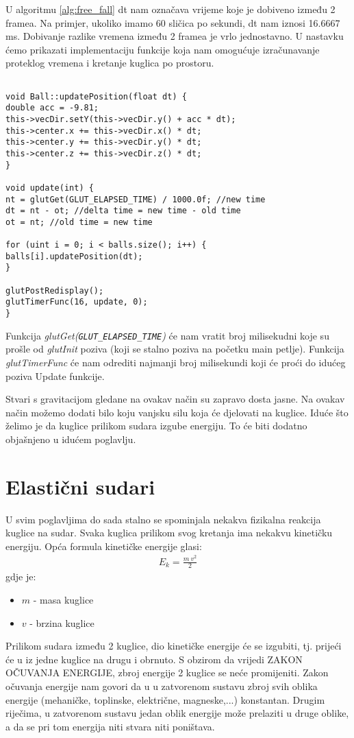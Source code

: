 U algoritmu \ref{alg:free_fall} dt nam označava vrijeme koje je dobiveno između 2 framea. Na primjer, ukoliko imamo 60 sličica po sekundi, dt nam iznosi 16.6667 ms. Dobivanje razlike vremena između 2 framea je vrlo jednostavno. U nastavku ćemo prikazati implementaciju funkcije koja nam omogućuje izračunavanje proteklog vremena i kretanje kuglica po prostoru. \newpage
\begin{lstlisting}[style = myC++, label = {code:12}, caption = {Implementacije update funkcija}]

void Ball::updatePosition(float dt) {
double acc = -9.81;
this->vecDir.setY(this->vecDir.y() + acc * dt);
this->center.x += this->vecDir.x() * dt;
this->center.y += this->vecDir.y() * dt;
this->center.z += this->vecDir.z() * dt;
}

void update(int) {
nt = glutGet(GLUT_ELAPSED_TIME) / 1000.0f; //new time
dt = nt - ot; //delta time = new time - old time
ot = nt; //old time = new time

for (uint i = 0; i < balls.size(); i++) {
balls[i].updatePosition(dt);
}

glutPostRedisplay();
glutTimerFunc(16, update, 0);
}
\end{lstlisting}

Funkcija \emph{glutGet(\texttt{GLUT\_ELAPSED\_TIME})} će nam vratit broj milisekudni koje su prošle od \emph{glutInit} poziva (koji se stalno poziva na početku main petlje). Funkcija \emph{glutTimerFunc} će nam odrediti najmanji broj milisekundi koji će proći do idućeg poziva Update funkcije.

Stvari s gravitacijom gledane na ovakav način su zapravo dosta jasne. Na ovakav način možemo dodati bilo koju vanjsku silu koja će djelovati na kuglice. Iduće što želimo je da kuglice prilikom sudara izgube energiju. To će biti dodatno objašnjeno u idućem poglavlju.\newpage
\section{Elastični sudari}
U svim poglavljima do sada stalno se spominjala nekakva fizikalna reakcija kuglice na sudar. Svaka kuglica prilikom svog kretanja ima nekakvu kinetičku energiju. Opća formula kinetičke energije glasi:
\begin{equation}\label{equ:kinetic}
	\begin{aligned}
	E_{k} = \frac{m \ v^2}{2}
	\end{aligned}
\end{equation}
gdje je:
\begin{itemize}
	\item $m$ - masa kuglice 
	\item $v$ - brzina kuglice
\end{itemize}
Prilikom sudara između 2 kuglice, dio kinetičke energije će se izgubiti, tj. prijeći će u iz jedne kuglice na drugu i obrnuto. S obzirom da vrijedi ZAKON OČUVANJA ENERGIJE, zbroj energije 2 kuglice se neće promijeniti. Zakon očuvanja energije nam govori da u u zatvorenom sustavu zbroj svih oblika energije (mehaničke, toplinske, električne, magneske,...) konstantan. Drugim riječima, u zatvorenom sustavu jedan oblik energije može prelaziti u druge oblike, a da se pri tom energija niti stvara niti poništava\cite{11}.

